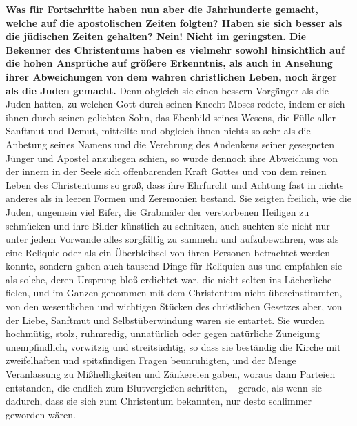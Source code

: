 \label{ref:07_14_vortschritt}
\textbf{Was für Fortschritte haben nun aber die
Jahrhunderte gemacht, welche auf die
apostolischen Zeiten folgten? Haben sie sich besser als die jüdischen Zeiten
gehalten? Nein! Nicht im geringsten. Die Bekenner des Christentums haben es
vielmehr sowohl hinsichtlich auf die hohen Ansprüche auf größere Erkenntnis, als
auch in Ansehung ihrer Abweichungen von dem wahren christlichen Leben, noch
ärger als die Juden gemacht.} Denn obgleich sie einen
bessern Vorgänger als die
Juden hatten, zu welchen Gott durch seinen Knecht Moses
redete, indem er sich
ihnen durch seinen geliebten Sohn, das Ebenbild seines Wesens, die Fülle aller
Sanftmut und Demut, mitteilte und obgleich ihnen nichts so sehr als die
Anbetung seines Namens und die Verehrung des Andenkens seiner gesegneten Jünger
und Apostel anzuliegen schien, so wurde dennoch ihre Abweichung von der innern
in der Seele sich offenbarenden Kraft Gottes und von dem reinen Leben des
Christentums so groß, dass ihre Ehrfurcht und Achtung fast in nichts anderes
als in leeren Formen und Zeremonien bestand. Sie zeigten freilich, wie die
Juden, ungemein viel Eifer, die Grabmäler der verstorbenen Heiligen
 zu schmücken
und ihre Bilder künstlich zu schnitzen, auch suchten sie nicht nur unter jedem
Vorwande alles sorgfältig zu sammeln und aufzubewahren, was als eine Reliquie
oder als ein Überbleibsel von ihren Personen betrachtet werden konnte, sondern
gaben auch tausend Dinge für Reliquien aus und empfahlen sie als solche, deren
Ursprung bloß erdichtet war, die nicht selten ins Lächerliche fielen, und im
Ganzen genommen mit dem Christentum nicht übereinstimmten, von den
wesentlichen und wichtigen Stücken des christlichen Gesetzes aber, von der
Liebe, Sanftmut und Selbstüberwindung waren sie entartet. Sie wurden
hochmütig, stolz, ruhmredig, unnatürlich oder gegen natürliche Zuneigung
unempfindlich, vorwitzig und streitsüchtig, so dass sie beständig die Kirche mit
zweifelhaften und spitzfindigen Fragen beunruhigten, und
der Menge Veranlassung
zu Mißhelligkeiten und Zänkereien gaben, woraus dann Parteien entstanden, die
endlich zum Blutvergießen
schritten, --
gerade, als wenn sie dadurch, dass sie
sich zum Christentum bekannten, nur desto schlimmer geworden wären.

\medskip

